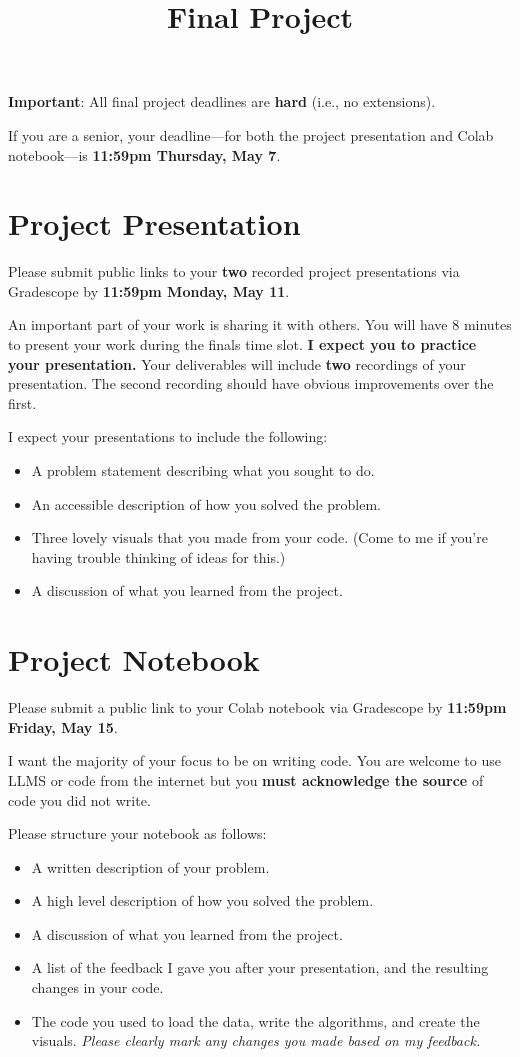 \documentclass{article}
\title{Final Project}
\date{}
\begin{document}
\maketitle

\noindent \textbf{Important}: All final project deadlines are \textbf{hard} (i.e., no extensions).
\newline

\noindent If you are a senior, your deadline---for both the project presentation and Colab notebook---is \textbf{11:59pm Thursday, May 7}.

\section{Project Presentation}
Please submit public links to your \textbf{two} recorded project presentations via Gradescope by \textbf{11:59pm Monday, May 11}.

An important part of your work is sharing it with others.
You will have 8 minutes to present your work during the finals time slot.
\textbf{I expect you to practice your presentation.}
Your deliverables will include \textbf{two} recordings of your presentation.
The second recording should have obvious improvements over the first.

I expect your presentations to include the following:
\begin{itemize}
    \item A problem statement describing what you sought to do.
    \item An accessible description of how you solved the problem.
    \item Three lovely visuals that you made from your code.
    (Come to me if you're having trouble thinking of ideas for this.)
    \item A discussion of what you learned from the project.
\end{itemize}

\section{Project Notebook}
Please submit a public link to your Colab notebook via Gradescope by \textbf{11:59pm Friday, May 15}.

I want the majority of your focus to be on writing code.
You are welcome to use LLMS or code from the internet but you \textbf{must acknowledge the source} of code you did not write.

Please structure your notebook as follows:
\begin{itemize}
    \item A written description of your problem.
    \item A high level description of how you solved the problem.
    \item A discussion of what you learned from the project.
    \item A list of the feedback I gave you after your presentation, and the resulting changes in your code.
    \item The code you used to load the data, write the algorithms, and create the visuals.
    \textit{Please clearly mark any changes you made based on my feedback.}
\end{itemize}
\end{document}
